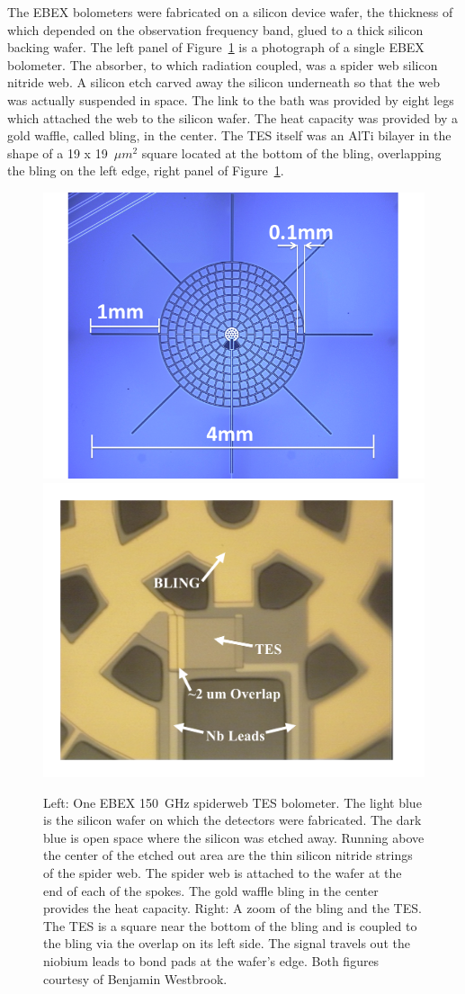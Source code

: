 The \ac{EBEX} bolometers were fabricated on a silicon device wafer, the thickness of which depended on the observation frequency band, glued to a thick silicon backing wafer.
The left panel of Figure~\ref{fig:bolo_and_bling} is a photograph of a single \ac{EBEX} bolometer. 
The absorber, to which radiation coupled, was a spider web silicon nitride web. 
A silicon etch carved away the silicon underneath so that the web was actually suspended in space.
The link to the bath was provided by eight legs which attached the web to the silicon wafer. 
The heat capacity was provided by a gold waffle, called bling, in the center. 
The \ac{TES} itself was an AlTi bilayer in the shape of a 19 x 19~$\mu m^{2}$ square located at the bottom of the bling, overlapping the bling on the left edge, right panel of Figure~\ref{fig:bolo_and_bling}.

\begin{figure}[ht!]
\begin{center}
\includegraphics[width=0.49\columnwidth]{figures/fullpixel1_v4_small_annotated.png}
\includegraphics[width=0.45\columnwidth]{figures/EBEX_BLINGTES_Annotated.png}
\caption{Left: One \ac{EBEX} 150~GHz spiderweb \ac{TES} bolometer. The light blue is the silicon wafer on which the detectors were fabricated. The dark blue is open space where the silicon was etched away. Running above the center of the etched out area are the thin silicon nitride strings of the spider web. The spider web is attached to the wafer at the end of each of the spokes. The gold waffle bling in the center provides the heat capacity. Right: A zoom of the bling and the \ac{TES}. The \ac{TES} is a square near the bottom of the bling and is coupled to the bling via the overlap on its left side. The signal travels out the niobium leads to bond pads at the wafer's edge. Both figures courtesy of Benjamin Westbrook. 
\label{fig:bolo_and_bling} }
\end{center}
\end{figure}

